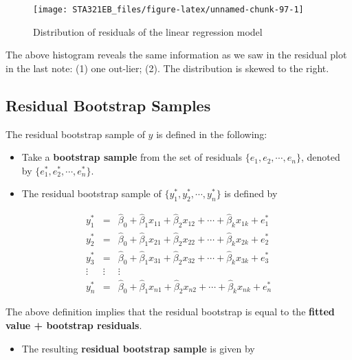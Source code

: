 \documentclass[
]{book}
\providecommand{\tightlist}{%
  \setlength{\itemsep}{0pt}\setlength{\parskip}{0pt}}
\begin{document}
\begin{figure}

{\centering \texttt{[image: STA321EB\_files/figure-latex/unnamed-chunk-97-1]} 

}

\caption{Distribution of residuals of the linear regression model}\label{fig:unnamed-chunk-97}
\end{figure}

The above histogram reveals the same information as we saw in the residual plot in the last note: (1) one out-lier; (2). The distribution is skewed to the right.

\hypertarget{residual-bootstrap-samples}{%
\subsection{Residual Bootstrap Samples}\label{residual-bootstrap-samples}}

The residual bootstrap sample of \(y\) is defined in the following:

\begin{itemize}
\item
  Take a \textbf{bootstrap sample} from the set of residuals \(\{e_1, e_2, \cdots, e_n \}\), denoted by \(\{e_1^{*}, e_2^{*}, \cdots, e_n^{*} \}\).
\item
  The residual bootstrap sample of \(\{y_1^{*}, y_2^{*}, \cdots, y_n^{*} \}\) is defined by
\end{itemize}

\[
\begin{array}{ccc} 
y_1^{*} & = &  \hat{\beta}_0 + \hat{\beta}_1 x_{11} + \hat{\beta}_2 x_{12} + \cdots + \hat{\beta}_k x_{1k} + e_1^{*}  \\
y_2^{*} & = &  \hat{\beta}_0 + \hat{\beta}_1 x_{21} + \hat{\beta}_2 x_{22} + \cdots + \hat{\beta}_k x_{2k} + e_2^{*}  \\
y_3^{*} & = &  \hat{\beta}_0 + \hat{\beta}_1 x_{31} + \hat{\beta}_2 x_{32} + \cdots + \hat{\beta}_k x_{3k} + e_3^{*}  \\
\vdots & \vdots & \vdots \\
y_n^{*} & = &  \hat{\beta}_0 + \hat{\beta}_1 x_{n1} + \hat{\beta}_2 x_{n2} + \cdots + \hat{\beta}_k x_{nk} + e_n^{*}
\end{array}
\]

The above definition implies that the residual bootstrap is equal to the \textbf{fitted value + bootstrap residuals}.

\begin{itemize}
\tightlist
\item
  The resulting \textbf{residual bootstrap sample} is given by
\end{itemize}
\end{document}
